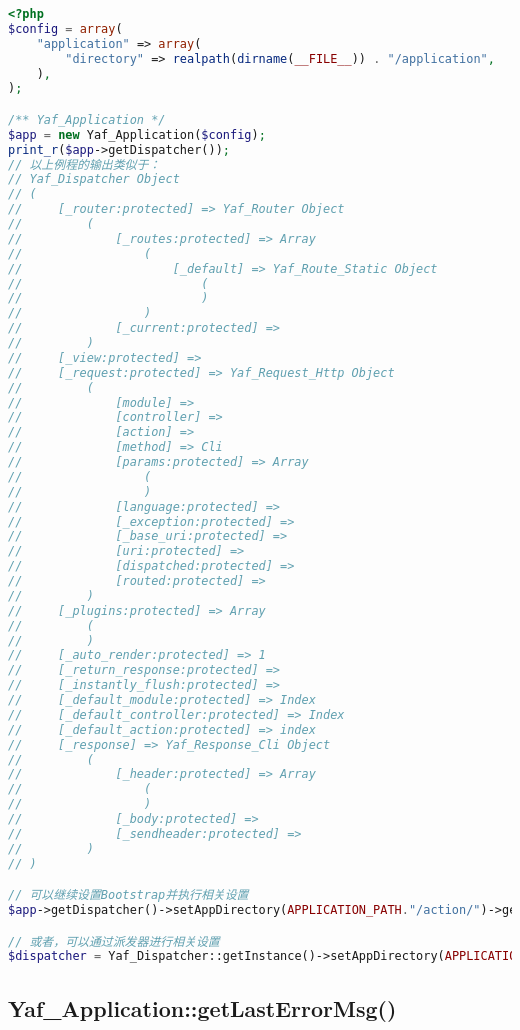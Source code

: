 \begin{lstlisting}[language=PHP]
<?php
$config = array(
    "application" => array(
        "directory" => realpath(dirname(__FILE__)) . "/application",
    ),
);

/** Yaf_Application */
$app = new Yaf_Application($config);
print_r($app->getDispatcher());
// 以上例程的输出类似于：
// Yaf_Dispatcher Object
// (
//     [_router:protected] => Yaf_Router Object
//         (
//             [_routes:protected] => Array
//                 (
//                     [_default] => Yaf_Route_Static Object
//                         (
//                         )
//                 )
//             [_current:protected] => 
//         )
//     [_view:protected] => 
//     [_request:protected] => Yaf_Request_Http Object
//         (
//             [module] => 
//             [controller] => 
//             [action] => 
//             [method] => Cli
//             [params:protected] => Array
//                 (
//                 )
//             [language:protected] => 
//             [_exception:protected] => 
//             [_base_uri:protected] => 
//             [uri:protected] => 
//             [dispatched:protected] => 
//             [routed:protected] => 
//         )
//     [_plugins:protected] => Array
//         (
//         )
//     [_auto_render:protected] => 1
//     [_return_response:protected] => 
//     [_instantly_flush:protected] => 
//     [_default_module:protected] => Index
//     [_default_controller:protected] => Index
//     [_default_action:protected] => index
//     [_response] => Yaf_Response_Cli Object
//         (
//             [_header:protected] => Array
//                 (
//                 )
//             [_body:protected] => 
//             [_sendheader:protected] => 
//         )
// )

// 可以继续设置Bootstrap并执行相关设置
$app->getDispatcher()->setAppDirectory(APPLICATION_PATH."/action/")->getApplication()->bootstrap()->run();

// 或者，可以通过派发器进行相关设置
$dispatcher = Yaf_Dispatcher::getInstance()->setAppDirectory(APPLICATION_PATH."/action/")->getApplication()->bootstrap()->run();
\end{lstlisting}



\subsection{Yaf\_Application::getLastErrorMsg()}

